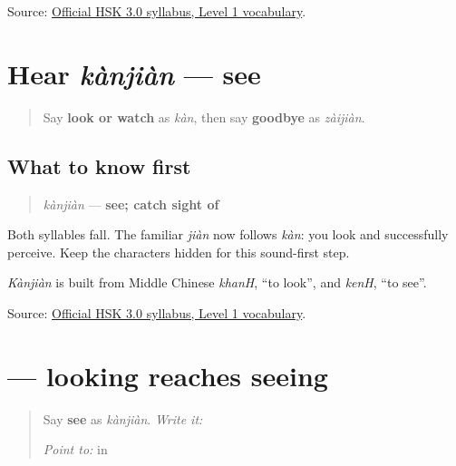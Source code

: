 \begin{tcolorbox}[breakable,colback=teal!4,colframe=teal!35!black,title={Before you move on}]
Source: \href{https://hsk.cn-bj.ufileos.com/3.0/\%E6\%96\%B0\%E7\%89\%88HSK\%E8\%80\%83\%E8\%AF\%95\%E5\%A4\%A7\%E7\%BA\%B21219.pdf}{Official HSK 3.0 syllabus, Level 1 vocabulary}.
\end{tcolorbox}
\section[kànjiàn]{Hear \emph{kànjiàn} — see}

\label{lesson:ZH-C18-hear-kanjian}



\begin{quote}
Say \textbf{look or watch} as \emph{kàn}, then say \textbf{goodbye} as \emph{zàijiàn}.
\end{quote}

\subsection*{What to know first}
\begin{quote}
\emph{kànjiàn} — \textbf{see; catch sight of}
\end{quote}

Both syllables fall. The familiar \emph{jiàn} now follows \emph{kàn}: you look and successfully perceive. Keep the characters hidden for this sound-first step.

\emph{Kànjiàn} is built from Middle Chinese \emph{khanH}, \textquotedblleft{}to look\textquotedblright{}, and \emph{kenH}, \textquotedblleft{}to see\textquotedblright{}.

\begin{tcolorbox}[breakable,colback=teal!4,colframe=teal!35!black,title={Before you move on}]
Source: \href{https://hsk.cn-bj.ufileos.com/3.0/\%E6\%96\%B0\%E7\%89\%88HSK\%E8\%80\%83\%E8\%AF\%95\%E5\%A4\%A7\%E7\%BA\%B21219.pdf}{Official HSK 3.0 syllabus, Level 1 vocabulary}.
\end{tcolorbox}
\section[\texorpdfstring{\zh{看见} (kànjiàn)}{看见 (kànjiàn)}]{ — looking reaches seeing}

\label{lesson:ZH-C18-kanjian}



\begin{quote}
Say \textbf{see} as \emph{kànjiàn}. \emph{Write it:} 

\emph{Point to:}  in 
\end{quote}

